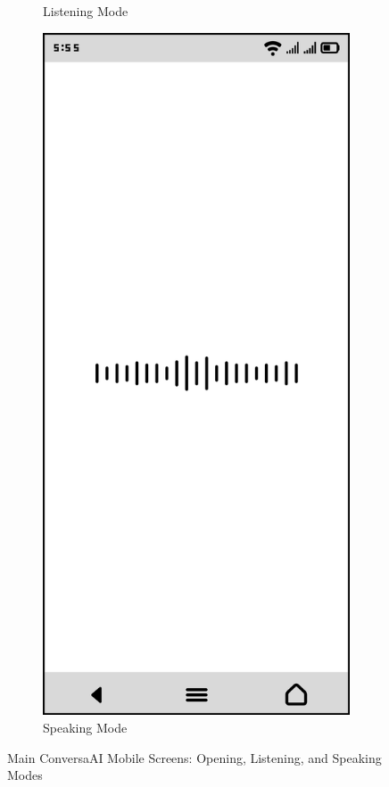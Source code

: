 \documentclass[12pt]{article}
\begin{document}
\begin{figure}[h!]
\begin{subfigure}[b]{0.32\textwidth}
        \caption{Listening Mode}
    \end{subfigure}
    \hfill
    \begin{subfigure}[b]{0.32\textwidth}
        \centering
        \includegraphics[width=\textwidth]{first_page_speaking.png}
        \caption{Speaking Mode}
    \end{subfigure}
    \caption{Main ConversaAI Mobile Screens: Opening, Listening, and Speaking Modes}
    \label{fig:mobile_ui}
\end{figure}
\end{document}
